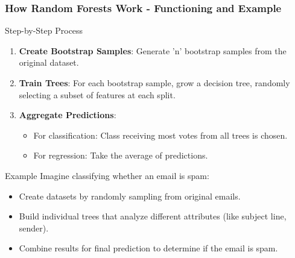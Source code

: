 \documentclass[aspectratio=169]{beamer}
\begin{document}
\begin{frame}[fragile]
    \frametitle{How Random Forests Work - Functioning and Example}
    \begin{block}{Step-by-Step Process}
        \begin{enumerate}
            \item \textbf{Create Bootstrap Samples}: Generate 'n' bootstrap samples from the original dataset.
            \item \textbf{Train Trees}: For each bootstrap sample, grow a decision tree, randomly selecting a subset of features at each split.
            \item \textbf{Aggregate Predictions}: 
                \begin{itemize}
                    \item For classification: Class receiving most votes from all trees is chosen.
                    \item For regression: Take the average of predictions.
                \end{itemize}
        \end{enumerate}
    \end{block}

    \begin{block}{Example}
        Imagine classifying whether an email is spam:
        \begin{itemize}
            \item Create datasets by randomly sampling from original emails.
            \item Build individual trees that analyze different attributes (like subject line, sender).
            \item Combine results for final prediction to determine if the email is spam.
        \end{itemize}
    \end{block}
\end{frame}
\end{document}
